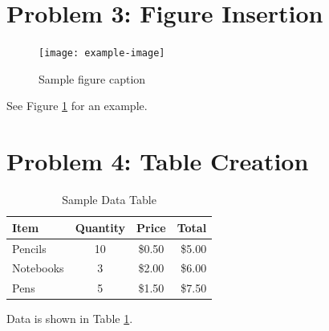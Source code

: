 \documentclass[12pt]{article}
\begin{document}
{}
\section*{Problem 3: Figure Insertion}
\begin{figure}[ht]
\centering
\texttt{[image: example-image]} %
\caption{Sample figure caption}
\label{fig:sample}
\end{figure}
See Figure \ref{fig:sample} for an example.

{}
\section*{Problem 4: Table Creation}
\begin{table}[ht]
\centering
\caption{Sample Data Table}
\label{tab:sample}
\begin{tabular}{lccr}
\toprule
Item & Quantity & Price & Total \\
\midrule
Pencils & 10 & \$0.50 & \$5.00 \\
Notebooks & 3 & \$2.00 & \$6.00 \\
Pens & 5 & \$1.50 & \$7.50 \\
\bottomrule
\end{tabular}
\end{table}
Data is shown in Table \ref{tab:sample}.
\end{document}
